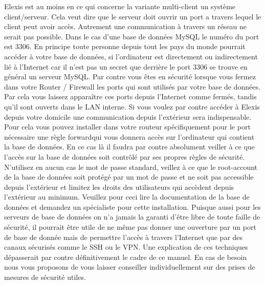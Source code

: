 Elexis est au moins en ce qui concerne la variante multi-client un système client/serveur. Cela veut dire que le serveur doit ouvrir un port a travers lequel le client peut avoir accès. Autrement une communication à travers un réseau ne serait pas possible. Dans le cas d'une base de données MySQL le numéro du port est 3306. En principe toute personne depuis tout les pays du monde pourrait accéder à votre base de données, si l'ordinateur est directement ou indirectement lié à l'Internet car il n'est pas un secret que derrière le port 3306 se trouve en général un serveur MySQL. Par contre vous êtes en sécurité lorsque vous fermez dans votre Router / Firewall les ports qui sont utilisés par votre base de données. Par cela vous laissez apparaître ces ports depuis l'Internet comme fermés, tandis qu'il sont ouverts dans le LAN interne. Si vous voulez par contre accéder à Elexis depuis votre domicile une communication depuis l'extérieur sera indispensable. Pour cela vous pouvez installer dans votre routeur spécifiquement pour le port nécessaire une règle \glqq forward\grqq qui vous donnera accès sur l'ordinateur qui contient la base de données. En ce cas là il faudra par contre absolument veiller à ce que l'accès sur la base de données soit contrôlé par ses propres règles de sécurité. N'utilisez en aucun cas le mot de passe standard, veillez à ce que le root-account de la base de données soit protégé par un mot de passe et ne soit pas accessible depuis l'extérieur et limitez les droits des utilisateurs qui accèdent depuis l'extérieur au minimum. Veuillez pour ceci lire la documentation de la base de données et demandez un spécialiste pour cette installation. Puisque aussi pour les serveurs de base de données on n'a jamais la garanti d'être libre de toute faille de sécurité, il pourrait être utile de ne même pas donner une ouverture par un port de base de donnée mais de permettre l'accès à travers l'Internet que par des canaux sécurisés comme le SSH ou le VPN. Une explication de ces techniques dépasserait par contre définitivement le cadre de ce manuel. En cas de besoin nous vous proposons de vous laisser conseiller individuellement sur des prises de mesures de sécurité utiles.

